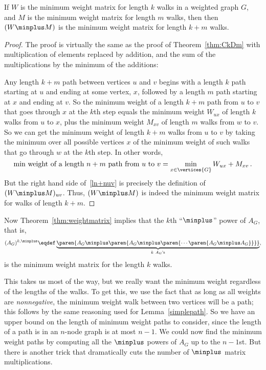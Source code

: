 \begin{theorem}\label{thm:weightmatrix}
  If $W$ is the minimum weight matrix for length $k$ walks in a weighted
  graph $G$, and $M$ is the minimum weight matrix for length $m$ walks,
  then then $(W\minplus M)$ is the minimum weight matrix for length $k+m$
  walks.
\end{theorem}

\begin{proof}
  The proof is virtually the same as the proof of Theorem~\ref{thm:CkDm}
  with multiplication of elements replaced by addition, and the sum of the
  multiplications by the minimum of the additions:

  Any length $k+m$ path between vertices $u$ and $v$ begins with a length
  $k$ path starting at $u$ and ending at some vertex, $x$, followed by a
  length $m$ path starting at $x$ and ending at $v$.  So the minimum
  weight of a length $k+m$ path from $u$ to $v$ that goes through $x$ at
  the $k$th step equals the minimum weight $W_{ux}$ of length $k$ walks
  from $u$ to $x$, plus the minimum weight $M_{xv}$ of length $m$ walks
  from $w$ to $v$.  So we can get the minimum weight of length $k+m$ walks
  from $u$ to $v$ by taking the minimum over all possible vertices $x$ of
  the minimum weight of such walks that go through $w$ at the $k$th step.
  In other words,
\begin{equation}\label{ln+nuv}
\text{min weight of a length $n+m$ path from $u$ to $v$} =
              \min_{x \in \vertices{G}} W_{ux}+M_{xv}\, .
\end{equation}
But the right hand side of~\eqref{ln+nuv} is precisely the definition of
$(W\minplus M)_{uv}$.  Thus, $(W\minplus M)$ is indeed the minimum weight
matrix for walks of length $k+m$.
\end{proof}

Now  Theorem~\ref{thm:weightmatrix} implies that the $k$th ``$\minplus$''
power of $A_G$, that is,
\[
(A_G)^{k, \minplus} \eqdef \underbrace{\paren{A_G \minplus \paren{A_G
      \minplus \paren{\cdots \paren{A_G \minplus A_G}} }}}_{k\ A_G\text{'s}},
\]
is the minimum weight matrix for the length $k$ walks.

This takes us most of the way, but we really want the minimum weight
regardless of the lengths of the walks.  To get this, we use the fact that
as long as all weights are \emph{nonnegative}, the minimum weight walk
between two vertices will be a path; this follows by the same reasoning
used for Lemma~\ref{simplepath}.  So we have an upper bound on the length
of minimum weight paths to consider, since the length of a path is in an
$n$-node graph is at most $n-1$.  We could now find the minimum weight
paths by computing all the $\minplus$ powers of $A_G$ up to the $n-1$st.
But there is another trick that dramatically cuts the number of $\minplus$
matrix multiplications.

